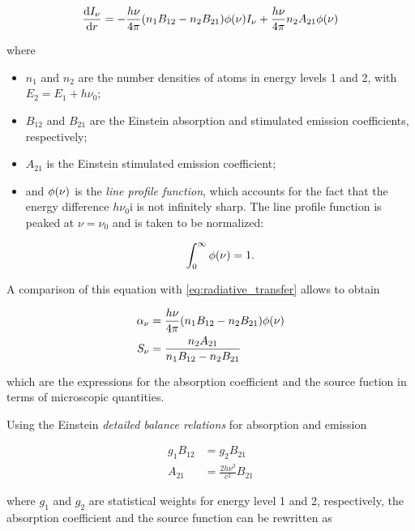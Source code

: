 \begin{equation}
        \dv{I_\nu}{r} = -\frac{h\nu}{4\pi}\qty(n_1 B_{12} -
        n_2 B_{21})\phi\qty(\nu)I_\nu +
        \frac{h\nu}{4\pi} n_2 A_{21}\phi\qty(\nu)
\end{equation}

where

\begin{itemize}
        \item $n_1$ and $n_2$ are the number densities of atoms in energy
        levels 1 and 2, with $E_2 = E_1 + h\nu_0$;
        \item $B_{12}$ and $B_{21}$ are the Einstein absorption and
        stimulated emission coefficients, respectively;
        \item $A_{21}$ is the Einstein stimulated emission coefficient;
        \item and $\phi\qty(\nu)$ is the \emph{line profile function},
        which accounts for the fact that the energy difference $h\nu_0$i
        is not infinitely sharp. The line profile function is peaked at
        $\nu = \nu_0$ and is taken to be normalized:

        \begin{equation}
                \int^\infty_0 \phi\qty(\nu) = 1.
        \end{equation}

\end{itemize}

A comparison of this equation with \autoref{eq:radiative_transfer} allows
to obtain

\begin{align}
        \alpha_\nu & = \frac{h\nu}{4\pi}\qty(n_1 B_{12} -
        n_2 B_{21})\phi\qty(\nu) \\
        S_\nu & = \frac{n_2 A_{21}}{n_1 B_{12} - n_2 B_{21}}
\end{align}

which are the expressions for the absorption coefficient and the source
fuction in terms of microscopic quantities.

Using the Einstein \emph{detailed balance relations} for absorption and
emission

\begin{align}
        g_1 B_{12} & = g_2 B_{21} \\
        A_{21} & = \frac{2h\nu^3}{c^2} B_{21}
\end{align}

where $g_1$ and $g_2$ are statistical weights for energy level 1 and 2,
respectively, the absorption coefficient and the source function can be
rewritten as

